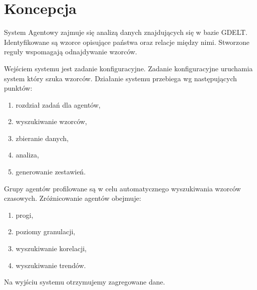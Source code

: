\documentclass[11pt]{report}
\begin{document}
    \chapter{Koncepcja}\label{ch:koncepcja}
    System Agentowy zajmuje się analizą danych znajdujących się w bazie GDELT\@.
    Identyfikowane są wzorce opisujące państwa oraz relacje między nimi.
    Stworzone reguły wspomagają odnajdywanie wzorców.

    Wejściem systemu jest zadanie konfiguracyjne.
    Zadanie konfiguracyjne uruchamia system który szuka wzorców.
    Działanie systemu przebiega wg następujących punktów:
    \begin{enumerate}
        \item rozdział zadań dla agentów,
        \item wyszukiwanie wzorców,
        \item zbieranie danych,
        \item analiza,
        \item generowanie zestawień.
    \end{enumerate}

    Grupy agentów profilowane są w celu automatycznego wyszukiwania wzorców czasowych.
    Zróżnicowanie agentów obejmuje:
    \begin{enumerate}
        \item progi,
        \item poziomy granulacji,
        \item wyszukiwanie korelacji,
        \item wyszukiwanie trendów.
    \end{enumerate}

    Na wyjściu systemu otrzymujemy zagregowane dane.
\end{document}
